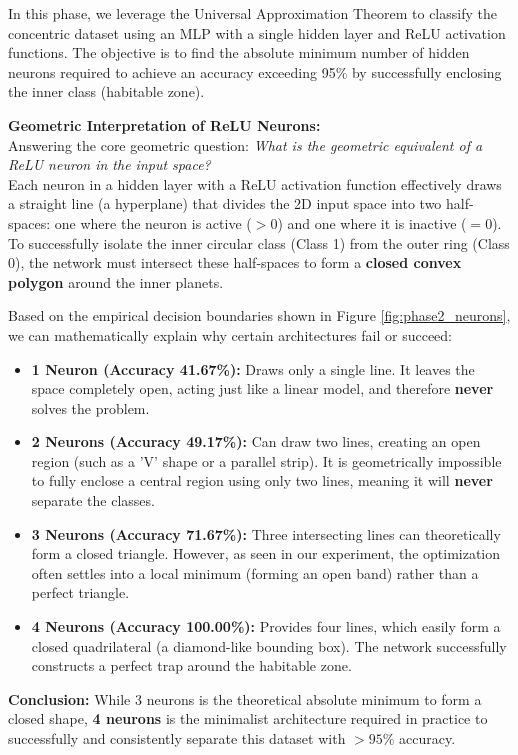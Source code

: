 \documentclass{article}
\begin{document}
In this phase, we leverage the Universal Approximation Theorem to classify the concentric dataset using an MLP with a single hidden layer and ReLU activation functions. The objective is to find the absolute minimum number of hidden neurons required to achieve an accuracy exceeding 95\% by successfully enclosing the inner class (habitable zone).

\textbf{Geometric Interpretation of ReLU Neurons:} \\
Answering the core geometric question: \textit{What is the geometric equivalent of a ReLU neuron in the input space?} \\
Each neuron in a hidden layer with a ReLU activation function effectively draws a straight line (a hyperplane) that divides the 2D input space into two half-spaces: one where the neuron is active ($>0$) and one where it is inactive ($=0$). To successfully isolate the inner circular class (Class 1) from the outer ring (Class 0), the network must intersect these half-spaces to form a \textbf{closed convex polygon} around the inner planets.

Based on the empirical decision boundaries shown in Figure \ref{fig:phase2_neurons}, we can mathematically explain why certain architectures fail or succeed:
\begin{itemize}
	\item \textbf{1 Neuron (Accuracy 41.67\%):} Draws only a single line. It leaves the space completely open, acting just like a linear model, and therefore \textbf{never} solves the problem.
	\item \textbf{2 Neurons (Accuracy 49.17\%):} Can draw two lines, creating an open region (such as a 'V' shape or a parallel strip). It is geometrically impossible to fully enclose a central region using only two lines, meaning it will \textbf{never} separate the classes.
	\item \textbf{3 Neurons (Accuracy 71.67\%):} Three intersecting lines can theoretically form a closed triangle. However, as seen in our experiment, the optimization often settles into a local minimum (forming an open band) rather than a perfect triangle.
	\item \textbf{4 Neurons (Accuracy 100.00\%):} Provides four lines, which easily form a closed quadrilateral (a diamond-like bounding box). The network successfully constructs a perfect trap around the habitable zone.
\end{itemize}

\textbf{Conclusion:} While 3 neurons is the theoretical absolute minimum to form a closed shape, \textbf{4 neurons} is the minimalist architecture required in practice to successfully and consistently separate this dataset with $>95\%$ accuracy.
\end{document}
